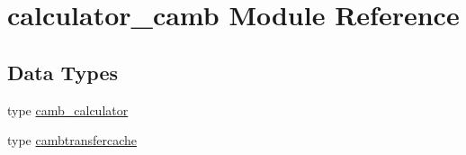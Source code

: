 \hypertarget{namespacecalculator__camb}{}\section{calculator\+\_\+camb Module Reference}
\label{namespacecalculator__camb}
\subsection*{Data Types}
\begin{DoxyCompactItemize}
\item 
type \mbox{\hyperlink{structcalculator__camb_1_1camb__calculator}{camb\+\_\+calculator}}
\item 
type \mbox{\hyperlink{structcalculator__camb_1_1cambtransfercache}{cambtransfercache}}
\end{DoxyCompactItemize}
